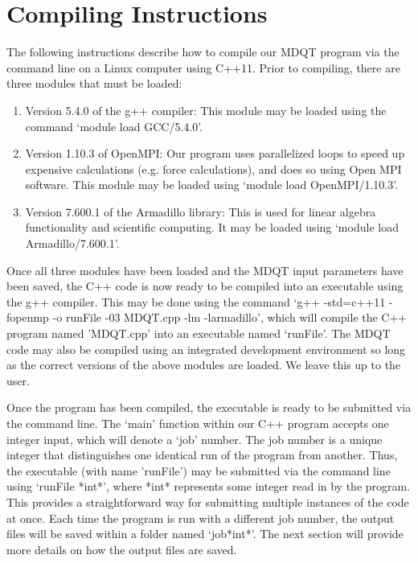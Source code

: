 \documentclass{article}
\begin{document}
	\section{Compiling Instructions} \label{compiling}
	
	The following instructions describe how to compile our MDQT program via the command line on a Linux computer using C++11. Prior to compiling, there are three modules that must be loaded:
	\begin{enumerate}
		\item Version 5.4.0 of the g++ compiler: This module may be loaded using the command `module load GCC/5.4.0'.
		
		\item Version 1.10.3 of OpenMPI: Our program uses parallelized loops to speed up expensive calculations (e.g. force calculations), and does so using Open MPI software. This module may be loaded using `module load OpenMPI/1.10.3'.
		
		\item Version 7.600.1 of the Armadillo library: This is used for linear algebra functionality and scientific computing. It may be loaded using `module load Armadillo/7.600.1'.
	\end{enumerate}

	Once all three modules have been loaded and the MDQT input parameters have been saved, the C++ code is now ready to be compiled into an executable using the g++ compiler. This may be done using the command `g++ -std=c++11 -fopenmp -o runFile -03 MDQT.cpp -lm -larmadillo', which will compile the C++ program named 'MDQT.cpp' into an executable named `runFile'. The MDQT code may also be compiled using an integrated development environment so long as the correct versions of the above modules are loaded. We leave this up to the user.
	
	Once the program has been compiled, the executable is ready to be submitted via the command line. The `main' function within our C++ program accepts one integer input, which will denote a `job' number. The job number is a unique integer that distinguishes one identical run of the program from another. Thus, the executable (with name 'runFile') may be submitted via the command line using `runFile *int*', where *int* represents some integer read in by the program. 
	This provides a straightforward way for submitting multiple instances of the code at once.
	Each time the program is run with a different job number, the output files will be saved within a folder named `job*int*'. The next section will provide more details on how the output files are saved.
	
\end{document}
